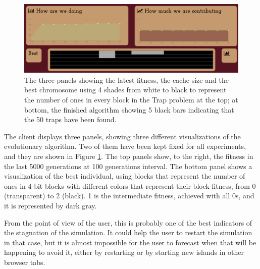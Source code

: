 \documentclass{sig-alternate}
\begin{document}
%
%
 
\begin{figure}[!htb]
\centering
\includegraphics[width=0.9\linewidth]{all.png}
\caption{The three panels showing the latest fitness, the cache size
  and the best chromosome using 4 shades from white to black to
  represent the number of ones in every block in the Trap
  problem at the top; at bottom, the finished algorithm showing 5
  black bars indicating that the 50 traps have been found. \label{fig:all}}
\end{figure}
%
The client displays three panels, showing three different
visualizations of the evolutionary algorithm. Two of them have been
kept fixed for all experiments, and they are shown in Figure
\ref{fig:all}. The top panels show, to the right, the fitness in the
last 5000 generations at 100 generations interval. The bottom panel
shows a visualization of the best individual, using blocks that
represent the number of ones in 4-bit blocks with different colors
that represent their block fitness, from 0 (transparent) to 2
(black). 1 is the intermediate fitness, achieved with all 0s, and it
is represented by dark gray. 

From the point of view of the user, this is probably one of the best
indicators of the stagnation of the simulation. %
It could help the user to restart the simulation
in that case, but it is almost impossible for the user to forecast
when that will be happening to avoid it, either by restarting or by
starting new islands in other browser tabs. 
\end{document}
